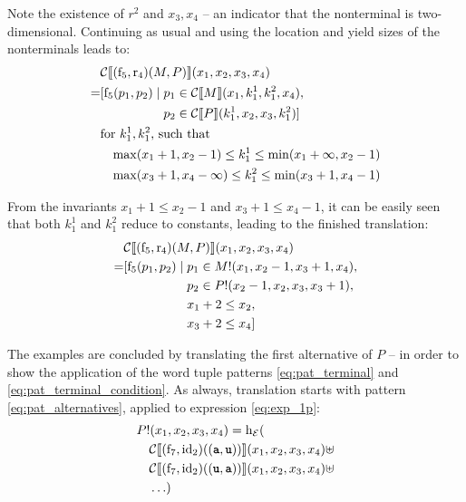 \documentclass[
    a4paper,
    12pt,
    twoside,
    BCOR=12mm,
    parskip=half,
    chapterprefix,
    numbers=noenddot,
    bibliography=totoc
]{scrbook}
\begin{document}
Note the existence of $r^2$ and $x_3,x_4$ -- an indicator that the nonterminal is two-dimensional. Continuing as usual and using the location and yield sizes of the nonterminals leads to:	
\begin{align*}
    &\mathcal{C} \llbracket (\op{f}_5,\op{r}_4)(M,P) \rrbracket (x_1,x_2,x_3,x_4) \\
  = &\!\begin{aligned}[t]
    [ \op{f}_5(p_1,p_2) \mid \; &p_1 \in \mathcal{C}\llbracket M \rrbracket (x_1,k^1_1,k^2_1,x_4),\\
    &p_2 \in \mathcal{C}\llbracket P \rrbracket (k^1_1,x_2,x_3,k^2_1)
    ]
    \end{aligned} \\
    &\text{for $k^1_1, k^2_1$, such that}\\
      &\quad\!\max(x_1 + 1, x_2 - 1) \leq k^1_1 \leq \min(x_1 + \infty, x_2 - 1)\\
      &\quad\!\max(x_3 + 1, x_4 - \infty) \leq k^2_1 \leq \min(x_3 + 1, x_4 - 1)
\end{align*}

From the invariants $x_1 + 1 \leq x_2 - 1$ and $x_3 + 1 \leq x_4 - 1$, it can be easily seen that both $k^1_1$ and $k^2_1$ reduce to constants, leading to the finished translation:
\begin{align*}
    &\mathcal{C} \llbracket (\op{f}_5,\op{r}_4)(M,P) \rrbracket (x_1,x_2,x_3,x_4) \\
  = &\!\begin{aligned}[t]
    [ \op{f}_5(p_1,p_2) \mid \; &p_1 \in M!(x_1,x_2-1,x_3+1,x_4),\\
    &p_2 \in P!(x_2-1,x_2,x_3,x_3+1),\\
    &x_1 + 2 \leq x_2,\\
    &x_3 + 2 \leq x_4
    ]
    \end{aligned}
\end{align*}

The examples are concluded by translating the first alternative of $P$ -- in order to show the application of the word tuple patterns \ref{eq:pat_terminal} and \ref{eq:pat_terminal_condition}. As always, translation starts with pattern \ref{eq:pat_alternatives}, applied to expression \ref{eq:exp_1p}:
\begin{align}
  &P!(x_1,x_2,x_3,x_4) = \op{h}_\mathcal{E}( \nonumber\\
  &\quad \mathcal{C}\llbracket (\op{f}_7,\op{id}_2)((\ts{a},\ts{u})) \rrbracket(x_1,x_2,x_3,x_4) \uplus \label{eq:exp_2p1} \\
  &\quad \mathcal{C}\llbracket (\op{f}_7,\op{id}_2)((\ts{u},\ts{a})) \rrbracket(x_1,x_2,x_3,x_4) \uplus \nonumber\\
  &\quad \ldots \nonumber )
\end{align}
\end{document}
